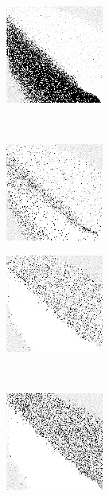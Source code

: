 
\begin{figure}
\center

	\begin{subfigure}[b]{0.4\textwidth}
		\includegraphics[height=0.23\textheight]{images/findings/round1/strategies_handmaxmin.png}
		\caption{\handmaxmin}
	\end{subfigure}
	~
	\begin{subfigure}[b]{0.4\textwidth}
		\includegraphics[height=0.23\textheight]{images/findings/round1/strategies_handmaxavg.png}
		\caption{\handmaxavg}
	\end{subfigure}

	\begin{subfigure}[b]{0.4\textwidth}
		\includegraphics[height=0.23\textheight]{images/findings/round1/strategies_handmaxmed.png}
		\caption{\handmaxmed}
	\end{subfigure}
	~
	\begin{subfigure}[b]{0.4\textwidth}
		\includegraphics[height=0.23\textheight]{images/findings/round1/strategies_handmaxposs.png}
		\caption{\handmaxposs}
	\end{subfigure}


\end{figure}
